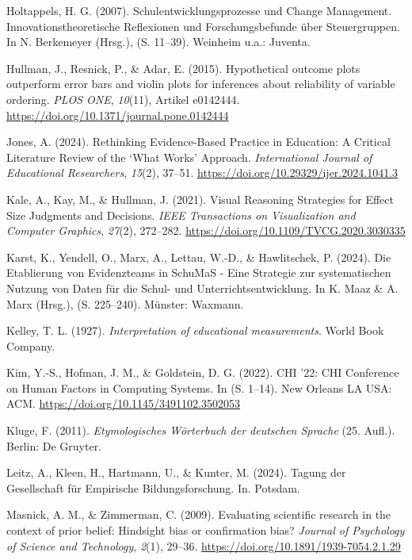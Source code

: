\documentclass[
  jou,
  floatsintext,
  longtable,
  nolmodern,
  notxfonts,
  notimes,
  colorlinks=true,linkcolor=blue,citecolor=blue,urlcolor=blue]{apa7}
\newlength{\cslhangindent}
\newenvironment{CSLReferences}[2] %
 {\begin{list}{}{%
  \setlength{\itemindent}{0pt}
  \setlength{\leftmargin}{0pt}
  \setlength{\parsep}{0pt}
  \ifodd #1
   \setlength{\leftmargin}{\cslhangindent}
   \setlength{\itemindent}{-1\cslhangindent}
  \fi
  \setlength{\itemsep}{#2\baselineskip}}}
 {\end{list}}
\begin{document}
\begin{CSLReferences}{1}{0}
Holtappels, H. G. (2007). Schulentwicklungsprozesse und Change
Management. Innovationstheoretische Reflexionen und Forschungsbefunde
über Steuergruppen. In N. Berkemeyer (Hrsg.), (S. 11--39). Weinheim
u.a.: Juventa.

Hullman, J., Resnick, P., \& Adar, E. (2015). Hypothetical outcome plots
outperform error bars and violin plots for inferences about reliability
of variable ordering. \emph{PLOS ONE}, \emph{10}(11), Artikel e0142444.
\url{https://doi.org/10.1371/journal.pone.0142444}

Jones, A. (2024). Rethinking Evidence-Based Practice in Education: A
Critical Literature Review of the {`}What Works{'} Approach.
\emph{International Journal of Educational Researchers}, \emph{15}(2),
37--51. \url{https://doi.org/10.29329/ijer.2024.1041.3}

Kale, A., Kay, M., \& Hullman, J. (2021). Visual {Reasoning Strategies}
for {Effect Size Judgments} and {Decisions}. \emph{IEEE Transactions on
Visualization and Computer Graphics}, \emph{27}(2), 272--282.
\url{https://doi.org/10.1109/TVCG.2020.3030335}

Karst, K., Yendell, O., Marx, A., Lettau, W.-D., \& Hawlitschek, P.
(2024). Die Etablierung von Evidenzteams in SchuMaS - Eine Strategie zur
systematischen Nutzung von Daten für die Schul- und
Unterrichtsentwicklung. In K. Maaz \& A. Marx (Hrsg.), (S. 225--240).
Münster: Waxmann.

Kelley, T. L. (1927). \emph{Interpretation of educational measurements}.
World Book Company.

Kim, Y.-S., Hofman, J. M., \& Goldstein, D. G. (2022). CHI '22: CHI
Conference on Human Factors in Computing Systems. In (S. 1--14). New
Orleans LA USA: ACM. \url{https://doi.org/10.1145/3491102.3502053}

Kluge, F. (2011). \emph{Etymologisches Wörterbuch der deutschen Sprache}
(25. Aufl.). Berlin: De Gruyter.

Leitz, A., Kleen, H., Hartmann, U., \& Kunter, M. (2024). Tagung der
Gesellschaft für Empirische Bildungsforschung. In. Potsdam.

Masnick, A. M., \& Zimmerman, C. (2009). Evaluating scientific research
in the context of prior belief: Hindsight bias or confirmation bias?
\emph{Journal of Psychology of Science and Technology}, \emph{2}(1),
29--36. \url{https://doi.org/10.1891/1939-7054.2.1.29}


\end{CSLReferences}
\end{document}
